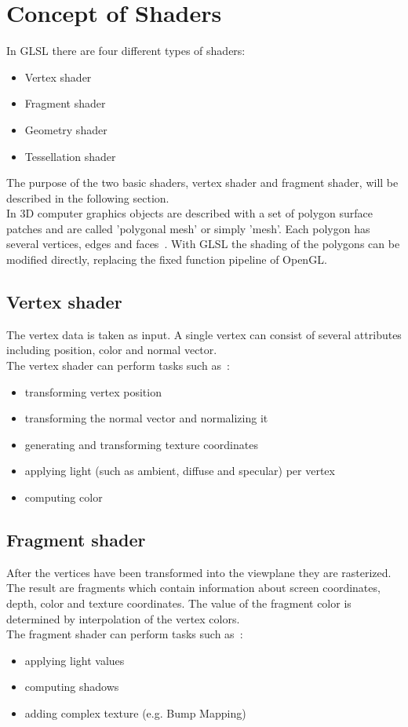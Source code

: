 \section{Concept of Shaders}

In GLSL there are four different types of shaders:
\begin{itemize}
	\item Vertex shader
	\item Fragment shader
	\item Geometry shader
	\item Tessellation shader
\end{itemize}

The purpose of the two basic shaders, vertex shader and fragment shader, will be described in the following section.\\
\newline
In 3D computer graphics objects are described with a set of polygon surface patches and are called 'polygonal mesh' or simply 'mesh'. Each polygon has several vertices, edges and faces~\cite{book:computerGraphicsHearn}. With GLSL the shading of the polygons can be modified directly, replacing the fixed function pipeline of OpenGL.

\subsection{Vertex shader}
The vertex data is taken as input. A single vertex can consist of several attributes including position, color and normal vector.\\
The vertex shader can perform tasks such as~\cite{book:computerGraphicsHill}: %
\begin{itemize}
	\item transforming vertex position
	\item transforming the normal vector and normalizing it
	\item generating and transforming texture coordinates
	\item applying light (such as ambient, diffuse and specular) per vertex
	\item computing color
\end{itemize}

\subsection{Fragment shader}	
After the vertices have been transformed into the viewplane they are rasterized. The result are fragments which contain information about screen coordinates, depth, color and texture coordinates. The value of the fragment color is determined by interpolation of the vertex colors.\\
The fragment shader can perform tasks such as~\cite{book:computerGraphicsHill}: %
\begin{itemize}
	\item applying light values
	\item computing shadows
	\item adding complex texture (e.g. Bump Mapping)
\end{itemize}

